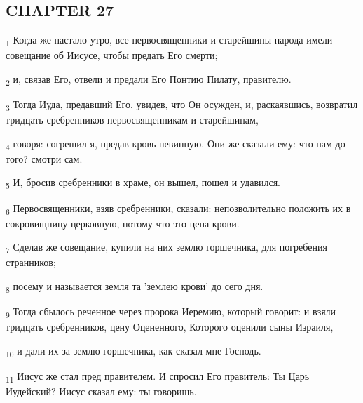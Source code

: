 \subsection{CHAPTER 27}
\begin{tcolorbox}
\textsubscript{1} Когда же настало утро, все первосвященники и старейшины народа имели совещание об Иисусе, чтобы предать Его смерти;
\end{tcolorbox}
\begin{tcolorbox}
\textsubscript{2} и, связав Его, отвели и предали Его Понтию Пилату, правителю.
\end{tcolorbox}
\begin{tcolorbox}
\textsubscript{3} Тогда Иуда, предавший Его, увидев, что Он осужден, и, раскаявшись, возвратил тридцать сребренников первосвященникам и старейшинам,
\end{tcolorbox}
\begin{tcolorbox}
\textsubscript{4} говоря: согрешил я, предав кровь невинную. Они же сказали ему: что нам до того? смотри сам.
\end{tcolorbox}
\begin{tcolorbox}
\textsubscript{5} И, бросив сребренники в храме, он вышел, пошел и удавился.
\end{tcolorbox}
\begin{tcolorbox}
\textsubscript{6} Первосвященники, взяв сребренники, сказали: непозволительно положить их в сокровищницу церковную, потому что это цена крови.
\end{tcolorbox}
\begin{tcolorbox}
\textsubscript{7} Сделав же совещание, купили на них землю горшечника, для погребения странников;
\end{tcolorbox}
\begin{tcolorbox}
\textsubscript{8} посему и называется земля та 'землею крови' до сего дня.
\end{tcolorbox}
\begin{tcolorbox}
\textsubscript{9} Тогда сбылось реченное через пророка Иеремию, который говорит: и взяли тридцать сребренников, цену Оцененного, Которого оценили сыны Израиля,
\end{tcolorbox}
\begin{tcolorbox}
\textsubscript{10} и дали их за землю горшечника, как сказал мне Господь.
\end{tcolorbox}
\begin{tcolorbox}
\textsubscript{11} Иисус же стал пред правителем. И спросил Его правитель: Ты Царь Иудейский? Иисус сказал ему: ты говоришь.
\end{tcolorbox}
